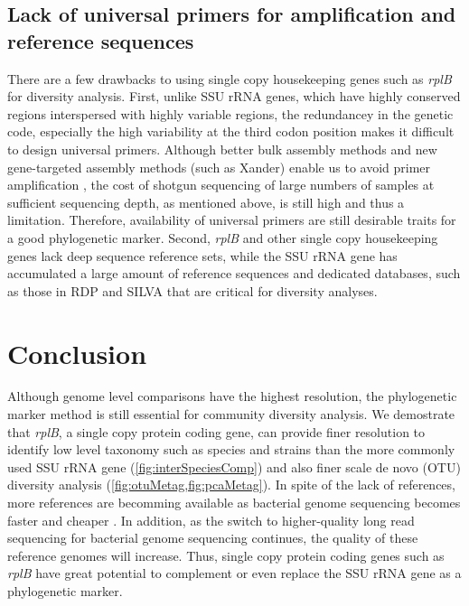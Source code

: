 \documentclass[]{msu-thesis}
\begin{document}
\subsection{Lack of universal primers for amplification and reference sequences}
There are a few drawbacks to using single copy housekeeping genes such as \textit{rplB} for diversity analysis. First, unlike SSU rRNA genes, which have highly conserved regions interspersed with highly variable regions, the redundancey in the genetic code, especially the high variability  at the third codon position makes it difficult to design universal primers. Although better bulk assembly methods and new gene-targeted assembly methods (such as Xander) enable us to avoid primer amplification \cite{guo_microbial_2015,wang_xander:_2015,miller_short-read_2013}, the cost of shotgun sequencing of large numbers of samples at sufficient sequencing depth, as mentioned above, is still high and thus a limitation. Therefore, availability of universal primers are still desirable traits for a good phylogenetic marker. Second, \textit{rplB} and other single copy housekeeping genes lack deep sequence reference sets, while the SSU rRNA gene has accumulated a large amount of reference sequences and dedicated databases, such as  those in RDP and SILVA \cite{cole_ribosomal_2014,quast_silva_2013} that are critical for diversity analyses.


\section{Conclusion}
Although genome level comparisons have the highest resolution, the phylogenetic marker method is still essential for community diversity analysis. We demostrate that \textit{rplB}, a single copy protein coding gene, can provide finer resolution to identify low level taxonomy such as species and strains than the more commonly used SSU rRNA gene (\cref{fig:interSpeciesComp}) and also finer scale de novo (OTU) diversity analysis (\cref{fig:otuMetag,fig:pcaMetag}). In spite of the lack of references, more references are becomming available as bacterial genome sequencing becomes faster and cheaper \cite{land_insights_2015}. In addition, as the switch to higher-quality long read sequencing for bacterial genome sequencing continues, the quality of these reference genomes will increase. Thus, single copy protein coding genes such as \textit{rplB} have great potential to complement or even replace the SSU rRNA gene as a phylogenetic marker.
\end{document}
